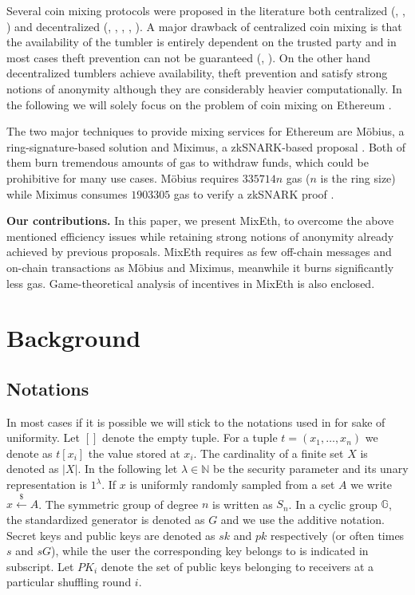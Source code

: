 \documentclass[a4paper]{article}
\theoremstyle{definition}
\begin{document}
Several coin mixing protocols were proposed in the literature both centralized (\cite{bonneau2014mixcoin}, \cite{valenta2015blindcoin}, \cite{heilman2017tumblebit}) and decentralized (\cite{maxwell2013coinjoin}, \cite{ruffing2014coinshuffle}, \cite{miximus2018}, \cite{meiklejohn2018mobius}, \cite{bissias2014sybil}). A major drawback of centralized coin mixing is that the availability of the tumbler is entirely dependent on the trusted party and in most cases theft prevention can not be guaranteed (\cite{bonneau2014mixcoin}, \cite{valenta2015blindcoin}). On the other hand decentralized tumblers achieve availability, theft prevention and satisfy strong notions of anonymity although they are considerably heavier computationally. In the following we will solely focus on the problem of coin mixing on Ethereum \cite{wood2014ethereum}. 

The two major techniques to provide mixing services for Ethereum are Möbius, a ring-signature-based solution \cite{meiklejohn2018mobius} and Miximus, a zkSNARK-based proposal \cite{miximus2018}. Both of them burn tremendous amounts of gas to withdraw funds, which could be prohibitive for many use cases. Möbius requires $\num[group-separator={,}]{335714}n$ gas ($n$ is the ring size) while Miximus consumes $\num[group-separator={,}]{1903305}$ gas to verify a zkSNARK proof \cite{miximus2018gascost}.   

\textbf{Our contributions.} In this paper, we present MixEth, to overcome the above mentioned efficiency issues while retaining strong notions of anonymity already achieved by previous proposals. MixEth requires as few off-chain messages and on-chain transactions as Möbius and Miximus, meanwhile it burns significantly less gas. Game-theoretical analysis of incentives in MixEth is also enclosed.


\section{Background}
\subsection{Notations}
In most cases if it is possible we will stick to the notations used in \cite{meiklejohn2018mobius} for sake of uniformity. 
Let $[]$ denote the empty tuple. For a tuple $t=(x_1,\dots,x_n)$ we denote as $t[x_i]$ the value stored at $x_{i}$. The cardinality of a finite set $X$ is denoted as $|X|$. In the following let $\lambda \in \mathbb{N}$ be the security parameter and its unary representation is $1^{\lambda}$. If $x$ is uniformly randomly sampled from a set $A$ we write $x\stackrel{\$}{\leftarrow}A$. The symmetric group of degree $n$ is written as ${S}_n$. In a cyclic group $\mathbb{G}$, the standardized generator is denoted as $G$ and we use the additive notation. Secret keys and public keys are denoted as $sk$ and $pk$ respectively (or often times $s$ and $sG$), while the user the corresponding key belongs to is indicated in subscript. Let $PK_{i}$ denote the set of public keys belonging to receivers at a particular shuffling round $i$.
\end{document}
